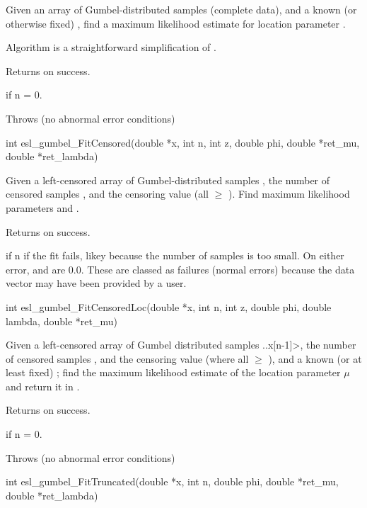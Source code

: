 \begin{sreapi}
Given an array of Gumbel-distributed samples 
 (complete data), and a known
(or otherwise fixed) , find a maximum
likelihood estimate for location parameter .

Algorithm is a straightforward simplification of
.

Returns  on success.

 if n = 0.

Throws (no abnormal error conditions)


\hypertarget{func:esl_gumbel_FitCensored()}
{\item[int esl\_gumbel\_FitCensored(double *x, int n, int z, double phi, double *ret\_mu, double *ret\_lambda)]}

Given a left-censored array of Gumbel-distributed samples
, the number of censored samples , and
the censoring value  (all  $\geq$ ).  Find
maximum likelihood parameters  and .

Returns  on success.

 if n if the fit fails, likey because the number
of samples is too small.
On either error,  and  are 0.0.
These are classed as failures (normal errors) because the
data vector may have been provided by a user.


\hypertarget{func:esl_gumbel_FitCensoredLoc()}
{\item[int esl\_gumbel\_FitCensoredLoc(double *x, int n, int z, double phi, double lambda, 
			  double *ret\_mu)]}

Given a left-censored array of Gumbel distributed samples
\ccode{x[0}..x[n-1]>, the number of censored samples , and the censoring
value  (where all  $\geq$ ), and a known
(or at least fixed) ;
find the maximum likelihood estimate of the location
parameter $\mu$ and return it in .

Returns  on success.

 if n = 0.

Throws (no abnormal error conditions)


\hypertarget{func:esl_gumbel_FitTruncated()}
{\item[int esl\_gumbel\_FitTruncated(double *x, int n, double phi, double *ret\_mu, double *ret\_lambda)]}


\end{sreapi}
